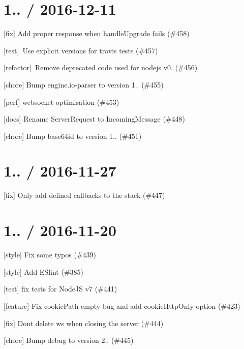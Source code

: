 \section*{1.. / 2016-\/12-\/11 }


\begin{DoxyItemize}
\item \mbox{[}fix\mbox{]} Add proper response when handle\+Upgrade fails (\#458)
\item \mbox{[}test\mbox{]} \+Use explicit versions for travis tests (\#457)
\item \mbox{[}refactor\mbox{]} \+Remove deprecated code used for nodejs v0. (\#456)
\item \mbox{[}chore\mbox{]} Bump engine.\+io-\/parser to version 1.. (\#455)
\item \mbox{[}perf\mbox{]} websocket optimisation (\#453)
\item \mbox{[}docs\mbox{]} Rename Server\+Request to Incoming\+Message (\#448)
\item \mbox{[}chore\mbox{]} Bump base64id to version 1.. (\#451)
\end{DoxyItemize}

\section*{1.. / 2016-\/11-\/27 }


\begin{DoxyItemize}
\item \mbox{[}fix\mbox{]} Only add defined callbacks to the stack (\#447)
\end{DoxyItemize}

\section*{1.. / 2016-\/11-\/20 }


\begin{DoxyItemize}
\item \mbox{[}style\mbox{]} Fix some typos (\#439)
\item \mbox{[}style\mbox{]} Add E\+Slint (\#385)
\item \mbox{[}test\mbox{]} fix tests for Node\+JS v7 (\#441)
\item \mbox{[}feature\mbox{]} Fix cookie\+Path empty bug and add cookie\+Http\+Only option (\#423)
\item \mbox{[}fix\mbox{]} Don\textquotesingle{}t delete ws when closing the server (\#444)
\item \mbox{[}chore\mbox{]} Bump debug to version 2.. (\#445)
\end{DoxyItemize}


